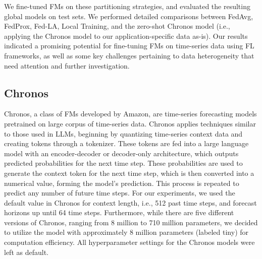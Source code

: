 We fine-tuned FMs on these partitioning strategies, and evaluated the resulting global models on test sets. 
We performed detailed comparisons between FedAvg, FedProx, Fed-LA, Local Training, and the zero-shot Chronos model (i.e., applying the Chronos model to our application-specific data as-is). 
Our results indicated a promising potential for fine-tuning FMs on time-series data using FL frameworks, as well as some key challenges pertaining to data heterogeneity that need attention and further investigation.

\subsection{Chronos}
Chronos, a class of FMs developed by Amazon, are time-series forecasting models pretrained on large corpus of time-series data. 
Chronos applies techniques similar to those used in LLMs, beginning by quantizing time-series context data and creating tokens through a tokenizer.
These tokens are fed into a large language model with an encoder-decoder or decoder-only architecture, which outputs predicted probabilities for the next time step.
These probabilities are used to generate the context token for the next time step, which is then converted into a numerical value, forming the model's prediction.
This process is repeated to predict any number of future time steps.
For our experiments, we used the default value in Chronos for context length, i.e., 512 past time steps, and forecast horizons up until 64 time steps.
Furthermore, while there are five different versions of Chronos, ranging from 8 million to 710 million parameters, we decided to utilize the model with approximately 8 million parameters (labeled tiny) for computation efficiency. 
All hyperparameter settings for the Chronos models were left as default.